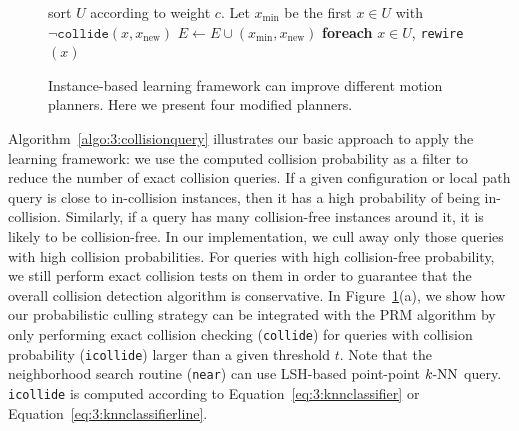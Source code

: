 \begin{figure}[htb]
{{\begin{minipage}{0.48\linewidth}
\begin{algorithmic}
        \STATE \quad \quad \quad sort $U$ according to weight $c$.
        \STATE \quad \quad \quad Let $x_{\text{min}}$ be the first $x \in U$ with $\neg \texttt{collide}(x, x_{\text{new}})$
        \STATE \quad \quad \quad $E \leftarrow E \cup (x_{\text{min}}, x_{\text{new}})$
        \STATE \quad \quad \quad \textbf{foreach} $x \in U$, \texttt{rewire}$(x)$
      \end{algorithmic}
  \end{minipage}}}
  \caption[Instance-based learning framework can be easily integrated with different motion planners]{Instance-based learning framework can improve different motion planners. Here we present four modified planners.}
  \label{fig:3:planners}
\end{figure}



Algorithm~\ref{algo:3:collisionquery} illustrates our basic approach to apply the learning framework: we use the computed collision probability as a filter to reduce the number of exact collision queries. If a given configuration or local path query is close to in-collision instances, then it has a high probability of being in-collision. Similarly, if a query has many collision-free instances around it, it is likely to be collision-free. In our implementation, we cull away only those queries with high collision probabilities. For queries with high collision-free probability, we still perform exact collision tests on them in order to guarantee that the overall collision detection algorithm is conservative.
In Figure~\ref{fig:3:planners}(a), we show how our probabilistic culling strategy can be integrated with the PRM algorithm by only performing exact collision checking (\texttt{collide}) for queries with collision probability (\texttt{icollide}) larger than a given threshold $t$.
Note that the neighborhood search routine (\texttt{near}) can use LSH-based point-point $k\text{-NN}$ query. \texttt{icollide} is computed according to Equation~\ref{eq:3:knnclassifier} or Equation~\ref{eq:3:knnclassifierline}.

